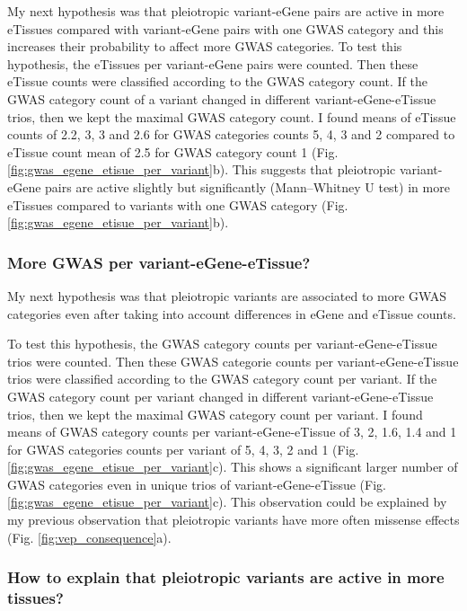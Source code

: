 My next hypothesis was that pleiotropic variant-eGene pairs are active in more eTissues compared with variant-eGene pairs with one GWAS category and this increases their probability to affect more GWAS categories.
%
To test this hypothesis, the eTissues per variant-eGene pairs were counted.
%
Then these eTissue counts were classified according to the GWAS category count.
%
If the GWAS category count of a variant changed in different variant-eGene-eTissue trios, then we kept the maximal GWAS category count.
%
I found means of eTissue counts of 2.2, 3, 3 and 2.6 for GWAS categories counts 5, 4, 3 and 2 compared to eTissue count mean of 2.5 for GWAS category count 1 (Fig. \ref{fig:gwas_egene_etisue_per_variant}b).
%
This suggests that pleiotropic variant-eGene pairs are active slightly but significantly (Mann–Whitney U test) in more eTissues compared to variants with one GWAS category (Fig. \ref{fig:gwas_egene_etisue_per_variant}b).

\subsubsection*{More GWAS per variant-eGene-eTissue?}

My next hypothesis was that pleiotropic variants are associated to more GWAS categories even after taking into account differences in eGene and eTissue counts.

To test this hypothesis, the GWAS category counts per variant-eGene-eTissue trios were counted.
%
Then these GWAS categorie counts per variant-eGene-eTissue trios were classified according to the GWAS category count per variant.
%
If the GWAS category count per variant changed in different variant-eGene-eTissue trios, then we kept the maximal GWAS category count per variant.
%
I found means of GWAS category counts per variant-eGene-eTissue of 3, 2, 1.6, 1.4 and 1 for GWAS categories counts per variant of 5, 4, 3, 2 and 1 (Fig. \ref{fig:gwas_egene_etisue_per_variant}c).
%
This shows a significant larger number of GWAS categories even in unique trios of variant-eGene-eTissue (Fig. \ref{fig:gwas_egene_etisue_per_variant}c).
%
This observation could be explained by my previous observation that pleiotropic variants have more often missense effects (Fig. \ref{fig:vep_consequence}a).

\subsubsection*{How to explain that pleiotropic variants are active in more tissues?}

